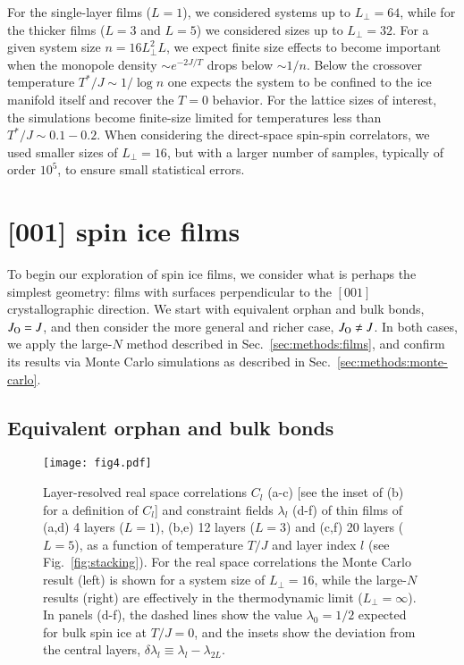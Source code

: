 \documentclass[aps,prx,reprint,runinaddress,superscriptaddress,amsmath,amssymb,floatfix,longbibliography]{revtex4-1}
\newcommand{\Jo}{J_{\rm O}}
\begin{document}
For the single-layer films ($L=1$), we considered systems up to $L_{\perp}=64$, while for the thicker films ($L=3$ and $L=5$) we considered sizes up to $L_{\perp}=32$. For a given system size $n = 16 L_{\perp}^2 L$, we expect finite size effects to become important when the monopole density $\sim e^{-2J/T}$ \cite{Castelnovo2011} drops below $\sim 1/n$. Below the crossover temperature ${T}^*/J\sim 1/\log{n}$ one expects the system to be confined to the ice manifold itself and recover the $T=0$ behavior. For the lattice sizes of interest, the simulations become finite-size limited for temperatures less than ${T}^*/J \sim 0.1-0.2$. When considering the direct-space spin-spin correlators, we used smaller sizes of $L_{\perp} = 16$, but with a larger number of samples, typically of order $10^5$, to ensure small statistical errors.

\section{[001] spin ice films}
\label{sec:results_001}
To begin our exploration of spin ice films, we consider what is perhaps the simplest geometry: films with surfaces perpendicular to the $[001]$ crystallographic direction. We start with equivalent orphan and bulk bonds, $\Jo=J$, and then consider the more general and richer case, $\Jo\ne J$. In both cases, we apply the large-$N$ method described in Sec.~\ref{sec:methods:films}, and confirm its results via Monte Carlo simulations as described in Sec.~\ref{sec:methods:monte-carlo}.

\subsection{Equivalent orphan and bulk bonds}
	
\begin{figure*}[htp]
  \centering
  \texttt{[image: fig4.pdf]}
	\caption{Layer-resolved real space correlations $C_l$ (a-c) [see the inset of (b) for a definition of $C_l$] and constraint fields $\lambda_l$ (d-f)
	of thin films of (a,d) 4 layers ($L=1$), (b,e) 12 layers ($L=3$) and (c,f) 20 layers ($L=5$), as a function of temperature $T/J$ and layer index $l$ (see Fig.~\ref{fig:stacking}).  For the real space correlations the Monte Carlo result (left) is shown for a system size of $L_{\perp}=16$, while the large-$N$ results (right) are effectively in the thermodynamic limit ($L_{\perp}=\infty$). In panels (d-f), the dashed lines show the value $\lambda_0 = 1/2$ expected for bulk spin ice at $T/J=0$, and the insets show the deviation from the central layers, $\delta \lambda_l \equiv \lambda_l - \lambda_{2L}$.
	\label{fig:thick_lambda}}
\end{figure*}
\end{document}
